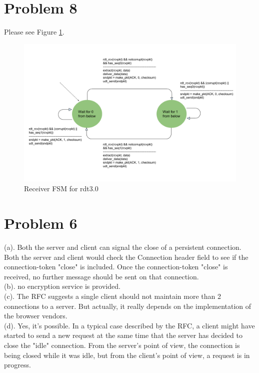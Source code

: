 \documentclass[titlepage, paper=a4, fontsize=11pt]{scrartcl} %
\numberwithin{equation}{section} %
\numberwithin{table}{section} %
\begin{document}
\section*{Problem 8}
Please see Figure \ref{fig:rdt3}.
\begin{figure}[!ht]
    \includegraphics[width=\textwidth]{images/rdt3-rcv-FSM.pdf}
    \caption{Receiver FSM for rdt3.0}
    \label{fig:rdt3}
\end{figure}




\section*{Problem 6}
(a). Both the server and client can signal the close of a persistent connection. Both the server and client
would check the Connection header field to see if the connection-token "close" is included. Once the
connection-token "close" is received, no further message should be sent on that connection. \\

(b). no encryption service is provided. \\

(c). The RFC suggests a single client should not maintain more than 2 connections to a server. But actually,
it really depends on the implementation of the browser vendors. \\

(d). Yes, it's possible. In a typical case described by the RFC, a client might have started to send a new request
at the same time that the server has decided to close the "idle" connection. From the server's point of view,
the connection is being closed while it was idle, but from the client's point of view, a request is in progress.\\
\\
\end{document}

